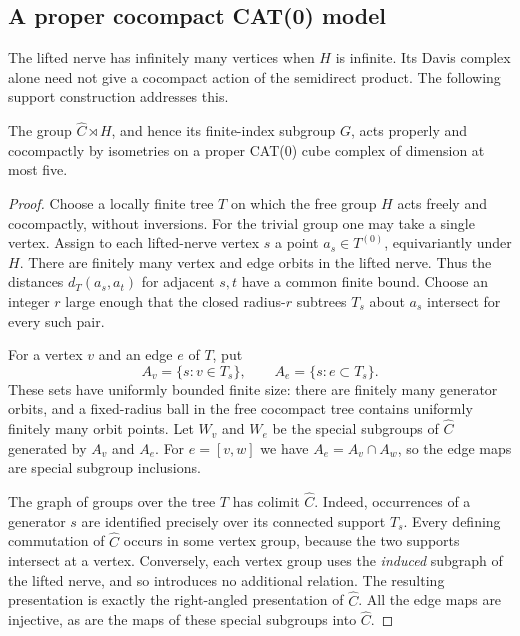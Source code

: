 \subsection{A proper cocompact CAT(0) model}
\label{rf:assembly}

The lifted nerve has infinitely many vertices when $H$ is infinite.
Its Davis complex alone need not give a cocompact action of the
semidirect product.  The following support construction addresses this.

\begin{lemma}
\label{rf:cat0}
The group $\widehat C\rtimes H$, and hence its finite-index subgroup
$G$, acts properly and cocompactly by isometries on a proper CAT(0)
cube complex of dimension at most five.
\end{lemma}

\begin{proof}
Choose a locally finite tree $T$ on which the free group $H$ acts
freely and cocompactly, without inversions.  For the trivial group
one may take a single vertex.  Assign to each lifted-nerve vertex
$s$ a point $a_s\in T^{(0)}$, equivariantly under $H$.  There are
finitely many vertex and edge orbits in the lifted nerve.  Thus the
distances $d_T(a_s,a_t)$ for adjacent $s,t$ have a common finite bound.
Choose an integer $r$ large enough that the closed radius-$r$ subtrees
$T_s$ about $a_s$ intersect for every such pair.

For a vertex $v$ and an edge $e$ of $T$, put
\[
 A_v=\{s:v\in T_s\},\qquad
 A_e=\{s:e\subset T_s\}.
\]
These sets have uniformly bounded finite size: there are finitely many
generator orbits, and a fixed-radius ball in the free cocompact tree
contains uniformly finitely many orbit points.  Let $W_v$ and $W_e$
be the special subgroups of $\widehat C$ generated by $A_v$ and $A_e$.
For $e=[v,w]$ we have $A_e=A_v\cap A_w$, so the edge maps are special
subgroup inclusions.

The graph of groups over the tree $T$ has colimit $\widehat C$.
Indeed, occurrences of a generator $s$ are identified precisely over
its connected support $T_s$.  Every defining commutation of
$\widehat C$ occurs in some vertex group, because the two supports
intersect at a vertex.  Conversely, each vertex group uses the
\emph{induced} subgraph of the lifted nerve, and so introduces no
additional relation.  The resulting presentation is exactly the
right-angled presentation of $\widehat C$.  All the edge maps are
injective, as are the maps of these special subgroups into
$\widehat C$.


\end{proof}
